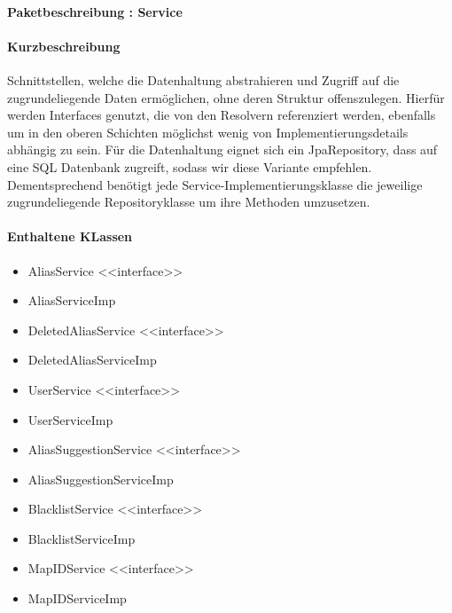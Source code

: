 \paragraph{Paketbeschreibung : Service}%
\paragraph*{Kurzbeschreibung}
Schnittstellen, welche die Datenhaltung abstrahieren und Zugriff auf die zugrundeliegende Daten ermöglichen, ohne deren Struktur offenszulegen.
Hierfür werden Interfaces genutzt, die von den Resolvern referenziert werden, ebenfalls um in den oberen Schichten möglichst 
wenig von Implementierungsdetails abhängig zu sein. Für die Datenhaltung eignet sich ein JpaRepository, dass auf 
eine SQL Datenbank zugreift, sodass wir diese Variante empfehlen. Dementsprechend benötigt jede Service-Implementierungsklasse die jeweilige 
zugrundeliegende Repositoryklasse um ihre Methoden umzusetzen. 
\paragraph*{Enthaltene KLassen}
\begin{itemize}
    \item AliasService <<interface>>
    \item AliasServiceImp
    \item DeletedAliasService <<interface>>
    \item DeletedAliasServiceImp
    \item UserService <<interface>>
    \item UserServiceImp
    \item AliasSuggestionService <<interface>>
    \item AliasSuggestionServiceImp
    \item BlacklistService <<interface>>
    \item BlacklistServiceImp
    \item MapIDService <<interface>>
    \item MapIDServiceImp
\end{itemize}

